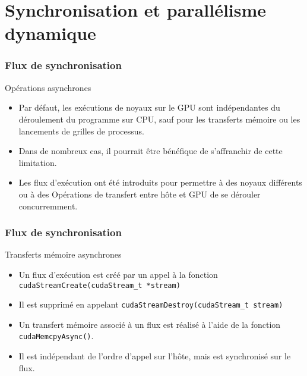\section{Synchronisation et parallélisme dynamique}
\begin{frame}
    \frametitle{Flux de synchronisation}
\begin{block}{Opérations asynchrones}
    \begin{itemize}
        \item<+-> Par défaut, les exécutions de noyaux sur le GPU sont indépendantes du déroulement
        du programme sur CPU, sauf pour les transferts mémoire ou les lancements de grilles de processus.
        \item<+-> Dans de nombreux cas, il pourrait être bénéfique de s'affranchir de cette limitation.
        \item<+-> Les flux d'exécution ont été introduits pour permettre à des noyaux différents ou à des Opérations
        de transfert entre hôte et GPU de se dérouler concurremment. 
    \end{itemize}
\end{block}
\end{frame}
\begin{frame}[fragile]
    \frametitle{Flux de synchronisation}
\begin{block}{Transferts mémoire asynchrones}
    \begin{itemize}
        \item<+-> Un flux d'exécution est créé par un appel à la fonction \texttt{cudaStreamCreate(cudaStream\_t *stream)}
        \item<+-> Il est supprimé en appelant \texttt{cudaStreamDestroy(cudaStream\_t stream)}
        \item<+-> Un transfert mémoire associé à un flux est réalisé à l'aide de la fonction \texttt{cudaMemcpyAsync()}.
        \item<+-> Il est indépendant de l'ordre d'appel sur l'hôte, mais est synchronisé sur le flux.
    \end{itemize}
\end{block}
\end{frame}